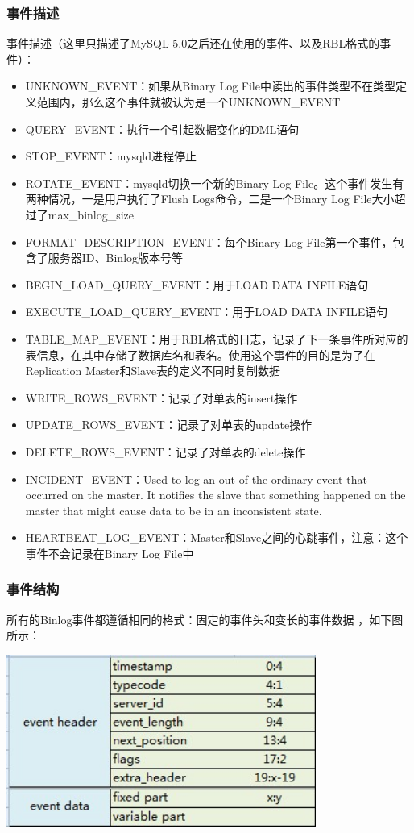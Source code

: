 \documentclass[a4paper, titlepage, 10pt, bookmark]{article}
\begin{document}
\subsubsection{事件描述}
事件描述（这里只描述了MySQL 5.0之后还在使用的事件、以及RBL格式的事件）：
\begin{itemize}
    \item UNKNOWN\_EVENT：如果从Binary Log File中读出的事件类型不在类型定义范围内，那么这个事件就被认为是一个UNKNOWN\_EVENT
    \item QUERY\_EVENT：执行一个引起数据变化的DML语句
    \item STOP\_EVENT：mysqld进程停止
    \item ROTATE\_EVENT：mysqld切换一个新的Binary Log File。这个事件发生有两种情况，一是用户执行了Flush Logs命令，二是一个Binary Log File大小超过了max\_binlog\_size
    \item FORMAT\_DESCRIPTION\_EVENT：每个Binary Log File第一个事件，包含了服务器ID、Binlog版本号等
    \item BEGIN\_LOAD\_QUERY\_EVENT：用于LOAD DATA INFILE语句
    \item EXECUTE\_LOAD\_QUERY\_EVENT：用于LOAD DATA INFILE语句
    \item TABLE\_MAP\_EVENT：用于RBL格式的日志，记录了下一条事件所对应的表信息，在其中存储了数据库名和表名。使用这个事件的目的是为了在Replication Master和Slave表的定义不同时复制数据
    \item WRITE\_ROWS\_EVENT：记录了对单表的insert操作
    \item UPDATE\_ROWS\_EVENT：记录了对单表的update操作
    \item DELETE\_ROWS\_EVENT：记录了对单表的delete操作
    \item INCIDENT\_EVENT：Used to log an out of the ordinary event that occurred on the master. It notifies the slave that something happened on the master that might cause data to be in an inconsistent state.
    \item HEARTBEAT\_LOG\_EVENT：Master和Slave之间的心跳事件，注意：这个事件不会记录在Binary Log File中
\end{itemize}

\subsubsection{事件结构}
所有的Binlog事件都遵循相同的格式：固定的事件头和变长的事件数据 ，如下图所示：
\begin{center}
\includegraphics[width=4in]{020.jpg}
\end{center}
\end{document}

